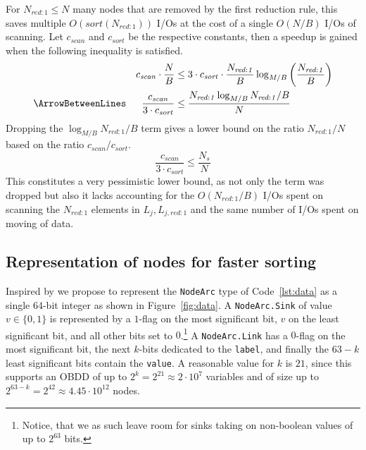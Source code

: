 For $N_{\mathit{red}:1} \leq N$ many nodes that are removed by the first
reduction rule, this saves multiple $O(sort(N_{\mathit{red:1}}))$ I/Os at the
cost of a single $O(N/B)$ I/Os of scanning. Let $c_{\mathit{scan}}$ and
$c_{\mathit{sort}}$ be the respective constants, then a speedup is gained when
the following inequality is satisfied.
\begin{alignat*}{2}
  &&c_{\mathit{scan}} \cdot \frac{N}{B}
  & \leq 3 \cdot c_{\mathit{sort}} \cdot \frac{N_{\mathit{red:1}}}{B}
           \log_{M/B} \left( \frac{N_{\mathit{red:1}}}{B} \right)
  \\ \ArrowBetweenLines
  &&\frac{c_{\mathit{scan}}}{3 \cdot c_{\mathit{sort}}}
  & \leq \frac{N_{\mathit{red:1}} \log_{M/B} N_{\mathit{red:1}} / B}{N}
\end{alignat*}
Dropping the $\log_{M/B} N_{\mathit{red:1}} / B$ term gives a lower bound on the
ratio $N_{\mathit{red:1}} / N$ based on the ratio $c_{\mathit{scan}} /
c_{\mathit{sort}}$.
\begin{equation}
    \frac{c_{\mathit{scan}}}{3 \cdot c_{\mathit{sort}}} \leq \frac{N_s}{N}
\end{equation}
This constitutes a very pessimistic lower bound, as not only the term was
dropped but also it lacks accounting for the $O(N_{\mathit{red:1}} / B)$ I/Os
spent on scanning the $N_{\mathit{red:1}}$ elements in $L_j,
L_{j,\mathit{red:1}}$ and the same number of I/Os spent on moving of data.


\subsection{Representation of nodes for faster sorting}
Inspired by \cite{Dijk16} we propose to represent the \lstinline{NodeArc} type
of Code~\ref{lst:data} as a single 64-bit integer as shown in
Figure~\ref{fig:data}. A \lstinline{NodeArc.Sink} of value $v \in \{0,1\}$ is
represented by a $1$-flag on the most significant bit, $v$ on the least
significant bit, and all other bits set to $0$.\footnote{Notice, that we as such
  leave room for sinks taking on non-boolean values of up to $2^{63}$ bits.} A
\lstinline{NodeArc.Link} has a $0$-flag on the most significant bit, the next
$k$-bits dedicated to the \lstinline{label}, and finally the $63-k$ least
significant bits contain the \lstinline{value}. A reasonable value for $k$ is
$21$, since this supports an OBDD of up to $2^k = 2^{21} \approx 2 \cdot 10^7$
variables and of size up to $2^{63-k} = 2^{42} \approx 4.45 \cdot 10^{12}$
nodes.

